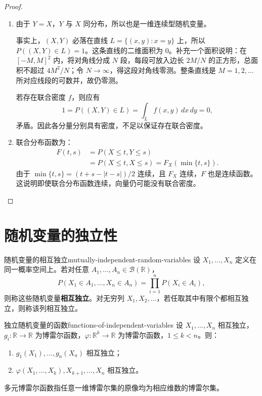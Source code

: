 \begin{proof}
\begin{enumerate}
\item 由于 $Y=X$，$Y$ 与 $X$ 同分布，所以也是一维连续型随机变量。

事实上，$(X,Y)$ 必落在直线 $L=\{(x,y):x=y\}$ 上，所以 $P((X,Y)\in L)=1$。这条直线的二维面积为 $0$。补充一个面积说明：在 $[-M,M]^2$ 内，将对角线分成 $N$ 段，每段可放入边长 $2M/N$ 的正方形，总面积不超过 $4M^2/N$；令 $N\to\infty$，得这段对角线零测。整条直线是 $M=1,2,\ldots$ 所对应线段的可数并，故仍零测。

若存在联合密度 $f$，则应有
\[
1=P((X,Y)\in L)=\int_Lf(x,y)\,dx\,dy=0,
\]
矛盾。因此各分量分别具有密度，不足以保证存在联合密度。

\item 联合分布函数为：
\begin{align*}
F(t,s)&=P(X\leq t,Y\leq s)\\
&=P(X\leq t,X\leq s)=F_X(\min\{t,s\}).
\end{align*}
由于 $\min\{t,s\}=(t+s-|t-s|)/2$ 连续，且 $F_X$ 连续，$F$ 也是连续函数。这说明即使联合分布函数连续，向量仍可能没有联合密度。
\end{enumerate}
\end{proof}

\clearpage\section{随机变量的独立性}\label{k:rvindependence}

\begin{mydefinition}{随机变量的相互独立}{mutually-independent-random-variables}
设 $X_1,\ldots,X_n$ 定义在同一概率空间上。若对任意 $A_1,\ldots,A_n\in\mathcal B(\mathbb R)$，
\[
P(X_1\in A_1,\ldots,X_n\in A_n)=\prod_{i=1}^nP(X_i\in A_i),
\]
则称这些随机变量\textbf{相互独立}。对无穷列 $X_1,X_2,\ldots$，若任取其中有限个都相互独立，则称该列相互独立。
\end{mydefinition}

\begin{proposition}{独立随机变量的函数}{functions-of-independent-variables}
设 $X_1,\ldots,X_n$ 相互独立，$g_i:\mathbb R\to\mathbb R$ 为博雷尔函数，$\varphi:\mathbb R^k\to\mathbb R$ 为博雷尔函数，$1\leq k<n$。则：
\begin{enumerate}
\item $g_1(X_1),\ldots,g_n(X_n)$ 相互独立；
\item $\varphi(X_1,\ldots,X_k),X_{k+1},\ldots,X_n$ 相互独立。
\end{enumerate}
多元博雷尔函数指任意一维博雷尔集的原像均为相应维数的博雷尔集。
\end{proposition}

